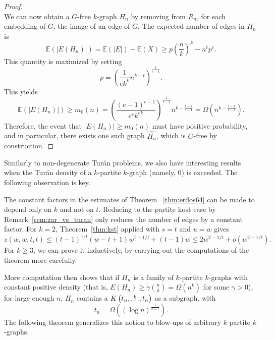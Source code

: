 \begin{proposition}
\begin{proof}
\[        \]
        We can now obtain a $G$-free $k$-graph $H_n$ by removing from $R_n$, for each embedding of $G$,
        the image of an edge of $G$.
        The expected number of edges in $H_n$ is
        \[
            \mathbb{E}(|E(H_n)|) = \mathbb{E}(|E|) - \mathbb{E}(X) \geq
            p \left( \frac{n}{k} \right)^k - n^t p^{e}.
        \]
        This quantity is maximized by setting
        \[
            p = \left( \frac{1}{ek^k} n^{k-t} \right)^{\frac{1}{e-1}}.
        \]
        This yields
        \[
            \mathbb{E}(|E(H_n)|) \geq
            m_0(n) =
            \left( \frac{(e-1)^{e-1}}{e^e k^{ek}} \right)^{\frac{1}{e-1}} n^{k - \frac{t-k}{e-1}}
            = \Omega\left(n^{k - \frac{t-k}{e-1}} \right).
        \]
        Therefore, the event that $|E(H_n)| \geq m_0(n)$
        must have positive probability, and in particular,
        there exists one such graph $\widehat{H_n}$, which is $G$-free by construction.
    \end{proof}
\end{proposition}

Similarly to non-degenerate Turán problems, we also have interesting results when the
Turán density of a $k$-partite $k$-graph (namely, $0$) is exceeded.
The following observation is key.

\begin{remark} \label{rem:uniform-t}
    The constant factors in the estimates of Theorem ~\ref{thm:erdos64} can be made to depend only on $k$ and not on $t$.
    Reducing to the partite host case by Remark~\ref{rem:zar_vs_turan} only reduces the number of edges by a constant factor.
    For $k=2$, Theorem~\ref{thm:kst} applied with $s = t$ and $u = w$
    gives
    \[
        z(w, w, t, t) \leq (t-1)^{1/t}(w-t+1)w^{1-1/t} + (t-1)w \leq 2w^{2 - 1/t} + o\left(w^{2-1/t}\right).
    \]
    For $k \geq 3$, we can prove it inductively, by carrying out the computations of the theorem more carefully.
\end{remark}

More computation then shows that if
$H_n$ is a family of $k$-partite $k$-graphs with constant positive density
(that is, $E(H_n) \geq \gamma \binom{n}{k} = \Omega\left( n^k \right)$ for some $\gamma > 0$),
for large enough $n$, $H_n$ contains a $K\left(t_n, \overset{k}{\dots}, t_n\right)$ as a subgraph, with
\[
    t_n = \Omega \left( (\log n)^{\frac{1}{k-1}}\right).
\]
The following theorem generalizes this notion to blow-ups of arbitrary $k$-partite $k$-graphs.

